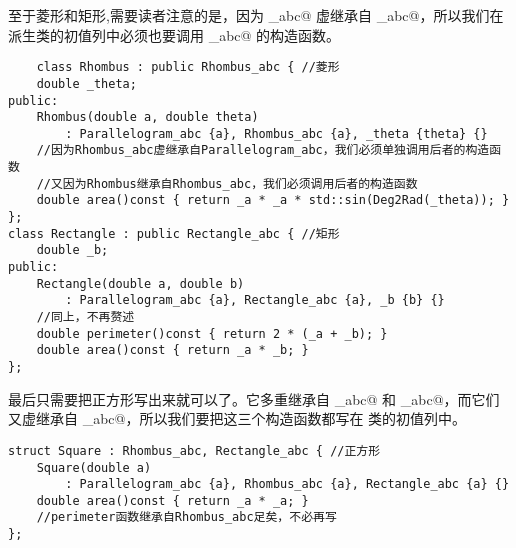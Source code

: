 至于菱形和矩形,需要读者注意的是，因为 \lstinline@Rhombus_abc@ 虚继承自 \lstinline@Parallelogram_abc@，所以我们在 \lstinline@Rhombus@ 派生类的初值列中必须也要调用 \lstinline@Parallelogram_abc@ 的构造函数。
\begin{lstlisting}
    class Rhombus : public Rhombus_abc { //菱形
    double _theta;
public:
    Rhombus(double a, double theta)
        : Parallelogram_abc {a}, Rhombus_abc {a}, _theta {theta} {}
    //因为Rhombus_abc虚继承自Parallelogram_abc，我们必须单独调用后者的构造函数
    //又因为Rhombus继承自Rhombus_abc，我们必须调用后者的构造函数
    double area()const { return _a * _a * std::sin(Deg2Rad(_theta)); }
};
class Rectangle : public Rectangle_abc { //矩形
    double _b;
public:
    Rectangle(double a, double b)
        : Parallelogram_abc {a}, Rectangle_abc {a}, _b {b} {}
    //同上，不再赘述
    double perimeter()const { return 2 * (_a + _b); }
    double area()const { return _a * _b; }
};
\end{lstlisting}\par
最后只需要把正方形写出来就可以了。它多重继承自 \lstinline@Rhombus_abc@ 和 \lstinline@Rectangle_abc@，而它们又虚继承自 \lstinline@Parallelogram_abc@，所以我们要把这三个构造函数都写在 \lstinline@Square@ 类的初值列中。
\begin{lstlisting}
struct Square : Rhombus_abc, Rectangle_abc { //正方形
    Square(double a)
        : Parallelogram_abc {a}, Rhombus_abc {a}, Rectangle_abc {a} {}
    double area()const { return _a * _a; }
    //perimeter函数继承自Rhombus_abc足矣，不必再写
};
\end{lstlisting}\par
